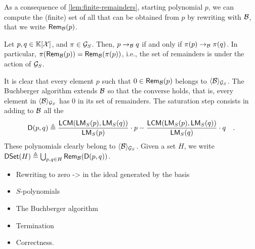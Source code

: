 \AP As a consequence of \cref{lem:finite-remainders}, starting polynomial $p$,
we can compute the (finite) set of all  that can be obtained
from $p$ by rewriting with $\Basis$, that we write $\rem{\Basis}{p}$. 

\begin{lemma}
    \label{lem:rewrite-equivariant}
    Let $p,q \in \mathbb{K}[\mathcal{X}]$, and $\pi \in \mathcal{G}_S$.
    Then,
    $p \reducstep{\Basis} q$ if and only if
    $\pi(p) \reducstep{\Basis} \pi(q)$.
    In particular, $\pi(\rem{\Basis}{p}) = \rem{\Basis}{\pi(p)}$,
    i.e., the set of remainders is 
    under the action of $\mathcal{G}_S$.
\end{lemma}

\AP It is clear that every element $p$ such that $0 \in \rem{\Basis}{p}$
belongs to $\gen{\Basis}{\group_S}$. The Buchberger algorithm extends $\Basis$
so that the converse holds, that is, every element in $\gen{\Basis}{\group_S}$
has $0$ in its set of remainders. The saturation step consists in adding to
$\Basis$ all the  
\begin{equation}
    \label{eq:d-polynomial}
    \spoly{p}{q} \defined
    \frac{\lcm(\lm[S](p), \lm[S](q))}{\lm[S](p)} \cdot p
    - \frac{\lcm(\lm[S](p), \lm[S](q))}{\lm[S](q)} \cdot q
    \quad .
\end{equation}
These polynomials clearly belong to $\gen{\Basis}{\group_S}$.
Given a set $H$, we write $\spolyset(H) \defined \bigcup_{p,q \in H}
\rem{\Basis}{\spoly{p}{q}}$.

\begin{lemma}
\end{lemma}

\begin{itemize}
    \item Rewriting to zero -> in the ideal generated by the basis
    \item $S$-polynomials 
    \item The Buchberger algorithm
    \item Termination
    \item Correctness.
\end{itemize}
